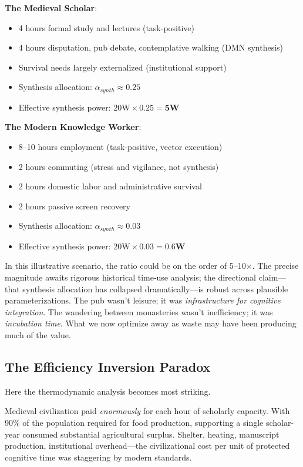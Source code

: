 \textbf{The Medieval Scholar}:
\begin{itemize}
    \item 4 hours formal study and lectures (task-positive)
    \item 4 hours disputation, pub debate, contemplative walking (DMN synthesis)
    \item Survival needs largely externalized (institutional support)
    \item Synthesis allocation: $\alpha_{synth} \approx 0.25$
    \item Effective synthesis power: $20\text{W} \times 0.25 = \mathbf{5\text{W}}$
\end{itemize}

\textbf{The Modern Knowledge Worker}:
\begin{itemize}
    \item 8--10 hours employment (task-positive, vector execution)
    \item 2 hours commuting (stress and vigilance, not synthesis)
    \item 2 hours domestic labor and administrative survival
    \item 2 hours passive screen recovery
    \item Synthesis allocation: $\alpha_{synth} \approx 0.03$
    \item Effective synthesis power: $20\text{W} \times 0.03 = \mathbf{0.6\text{W}}$
\end{itemize}

In this illustrative scenario, the ratio could be on the order of 5--10$\times$. The precise magnitude awaits rigorous historical time-use analysis; the directional claim—that synthesis allocation has collapsed dramatically—is robust across plausible parameterizations. The pub wasn't leisure; it was \textit{infrastructure for cognitive integration}. The wandering between monasteries wasn't inefficiency; it was \textit{incubation time}. What we now optimize away as waste may have been producing much of the value.

\subsection{The Efficiency Inversion Paradox}

Here the thermodynamic analysis becomes most striking.

Medieval civilization paid \textit{enormously} for each hour of scholarly capacity. With 90\% of the population required for food production, supporting a single scholar-year consumed substantial agricultural surplus. Shelter, heating, manuscript production, institutional overhead—the civilizational cost per unit of protected cognitive time was staggering by modern standards.

